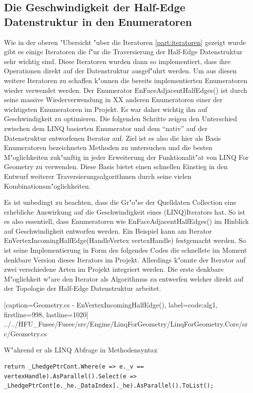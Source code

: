 \documentclass[pagesize, paper=a4, fontsize=12pt,titlepage=true, headings=small, headnosepline, abstractoff, liststotoc, nochapterprefix, plainheadsepline]{scrreprt}
\newcommand{\LFGS}{LINQ For Geometry }
\newcommand{\HES}{Half-Edge Datenstruktur }
\begin{document}
\subsection {Die Geschwindigkeit der Half-Edge Datenstruktur in den Enumeratoren}
Wie in der oberen "Ubersicht "uber die Iteratoren \ref{part:iteratoren} gezeigt wurde gibt es einige Iteratoren die f"ur die Traversierung der \HES sehr wichtig sind. Diese Iteratoren wurden dann so implementiert, dass ihre Operationen direkt auf der Datenstruktur ausgef"uhrt werden. Um aus diesen weitere Iteratoren zu schaffen k"onnen die bereits implementierten Enumeratoren wieder verwendet werden. Der Enumerator EnFaceAdjacentHalfEdges() ist durch seine massive Wiederverwendung in XX anderen Enumeratoren einer der wichtigsten Enumeratoren im Projekt. Es war daher wichtig ihn auf Geschwindigkeit zu optimieren. Die folgenden Schritte zeigen den Unterschied zwischen dem LINQ basierten Enumerator und dem "`nativ"' auf der Datenstruktur entworfenen Iterator auf. Ziel ist es also die hier als Basis Enumeratoren bezeichneten Methoden zu untersuchen und die besten M"oglichkeiten zuk"unftig in jeder Erweiterung der Funktionalit"at von \LFGS zu verwenden. Diese Basis bietet einen schnellen Einstieg in den Entwurf weiterer Traversierungsalgorithmen durch seine vielen Kombinationsm"oglichkeiten.

Es ist unbedingt zu beachten, dass die Gr"o"se der Quelldaten Collection eine erhebliche Auswirkung auf die Geschwindigkeit eines (LINQ)Iterators hat. So ist es also essentiell, dass Enumeratoren wie EnFaceAdjacentHalfEdges() im Hinblick auf Geschwindigkeit entworfen werden. Ein Beispiel kann am Iterator EnVertexIncomingHalfEdge(HandleVertex vertexHandle) festgemacht werden. So ist seine Implementierung in Form des folgendes Codes die schnellste im Moment denkbare Version dieses Iterators im Projekt. Allerdings k"onnte der Iterator auf zwei verschiedene Arten im Projekt integriert werden. Die erste denkbare M"oglichkeit w"are den Iterator als Algorithmus zu entwerfen welcher direkt auf der Topologie der \HES arbeitet.

			[caption={Geometry.cs - EnVertexIncomingHalfEdge()}, label=code:alg1, firstline=998, lastline=1020]
			{../../HFU_Fusee/Fusee/src/Engine/LinqForGeometry/LinqForGeometry.Core/src/Geometry.cs}

W"ahrend er als LINQ Abfrage in Methodensyntax
\begin{lstlisting}[label={code:alg3}]
return _LhedgePtrCont.Where(e => e._v == vertexHandle).AsParallel().Select(e => _LhedgePtrCont[e._he._DataIndex]._he).AsParallel().ToList();
\end{lstlisting}
\end{document}
